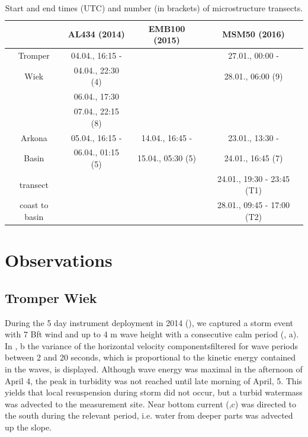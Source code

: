  \begin{table}
\caption{Start and end times (UTC) and number (in brackets) of microstructure 
transects.}\label{mss}
\begin{center}
\begin{tabular}{cccc}
 & AL434 (2014) & EMB100 (2015) & MSM50 (2016)\\
 \hline
Tromper & 04.04., 16:15 - & & 27.01., 00:00 - \\ 
Wiek & 04.04., 22:30 (4) & & 28.01., 06:00 (9)\\
 & 06.04., 17:30 & & \\
 &  07.04., 22:15 (8) & & \\
\hline
Arkona & 05.04., 16:15 - & 14.04., 16:45 - & 23.01., 13:30 - \\
Basin & 06.04., 01:15 (5) & 15.04., 05:30 (5) & 24.01., 16:45 (7)\\
\hline
transect &  & & 24.01., 19:30 - 23:45 (T1)\\
coast to basin & & & 28.01., 09:45 - 17:00 (T2)\\
\end{tabular}
\end{center}
\end{table}

\section{Observations}

\subsection{Tromper Wiek}

During the 5 day instrument deployment in 2014 (), we captured 
a storm event with 7 Bft wind and up to 4 m wave height with a consecutive calm 
period (, a). In , b the variance of the 
horizontal velocity componentsfiltered for wave periods between 2 and 20 
seconds, which is proportional to the kinetic energy contained in the 
waves, is displayed. Although wave energy was maximal in the afternoon of April 
4, the peak in turbidity was not reached until late morning of April, 5. This 
yields that local resuspension during storm did not occur, but a turbid 
watermass was advected to the measurement site. Near bottom current 
(,c) was directed to the south during the relevant period, 
i.e. water from deeper parts was advected up the slope.

